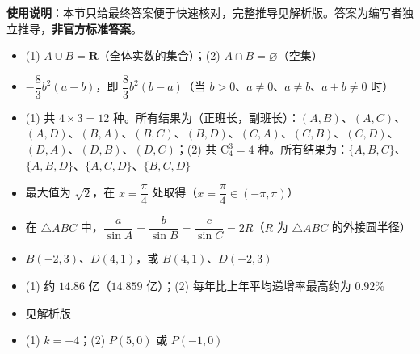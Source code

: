 
\begin{gknotice}
\textbf{使用说明}：本节只给最终答案便于快速核对，完整推导见解析版。答案为编写者独立推导，\textbf{非官方标准答案}。
\end{gknotice}

\begin{itemize}[leftmargin=2.6em]
  \item[\textbf{1.}] (1) $A\cup B=\mathbf{R}$（全体实数的集合）；(2) $A\cap B=\varnothing$（空集）
  \item[\textbf{2.}] $-\dfrac83b^2(a-b)$，即 $\dfrac83b^2(b-a)$（当 $b>0$、$a\ne0$、$a\ne b$、$a+b\ne0$ 时）
  \item[\textbf{3.}] (1) 共 $4\times3=12$ 种。所有结果为（正班长，副班长）：$(A,B)$、$(A,C)$、$(A,D)$、$(B,A)$、$(B,C)$、$(B,D)$、$(C,A)$、$(C,B)$、$(C,D)$、$(D,A)$、$(D,B)$、$(D,C)$；(2) 共 $\mathrm{C}_4^3=4$ 种。所有结果为：$\{A,B,C\}$、$\{A,B,D\}$、$\{A,C,D\}$、$\{B,C,D\}$
  \item[\textbf{4.}] 最大值为 $\sqrt2$，在 $x=\dfrac\pi4$ 处取得（$x=\dfrac\pi4\in(-\pi,\pi)$）
  \item[\textbf{5.}] 在 $\triangle ABC$ 中，$\dfrac a{\sin A}=\dfrac b{\sin B}=\dfrac c{\sin C}=2R$（$R$ 为 $\triangle ABC$ 的外接圆半径）
  \item[\textbf{6.}] $B(-2,3)$、$D(4,1)$，或 $B(4,1)$、$D(-2,3)$
  \item[\textbf{7.}] (1) 约 $14.86$ 亿（$14.859$ 亿）；(2) 每年比上年平均递增率最高约为 $0.92\%$
  \item[\textbf{8.}] 见解析版
  \item[\textbf{9.}] (1) $k=-4$；(2) $P(5,0)$ 或 $P(-1,0)$
\end{itemize}
